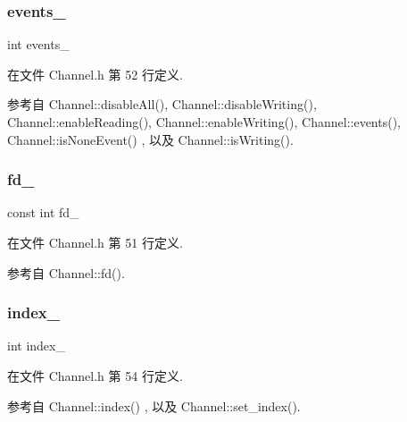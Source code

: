 \subsubsection{\texorpdfstring{events\+\_\+}{events\_}}
{\footnotesize\ttfamily int events\+\_\+\hspace{0.3cm}{\ttfamily [private]}}



在文件 Channel.\+h 第 52 行定义.



参考自 Channel\+::disable\+All(), Channel\+::disable\+Writing(), Channel\+::enable\+Reading(), Channel\+::enable\+Writing(), Channel\+::events(), Channel\+::is\+None\+Event() , 以及 Channel\+::is\+Writing().

\mbox{\label{classmuduo_1_1Channel_a09562e53209b1f330f5139f6eccce269}} 
\subsubsection{\texorpdfstring{fd\+\_\+}{fd\_}}
{\footnotesize\ttfamily const int fd\+\_\+\hspace{0.3cm}{\ttfamily [private]}}



在文件 Channel.\+h 第 51 行定义.



参考自 Channel\+::fd().

\mbox{\label{classmuduo_1_1Channel_aaaf1ac02dfa554a3cdffc647d512a77b}} 
\subsubsection{\texorpdfstring{index\+\_\+}{index\_}}
{\footnotesize\ttfamily int index\+\_\+\hspace{0.3cm}{\ttfamily [private]}}



在文件 Channel.\+h 第 54 行定义.



参考自 Channel\+::index() , 以及 Channel\+::set\+\_\+index().

\mbox{\label{classmuduo_1_1Channel_a7873ae2887674cb643986d9f04745444}} 
